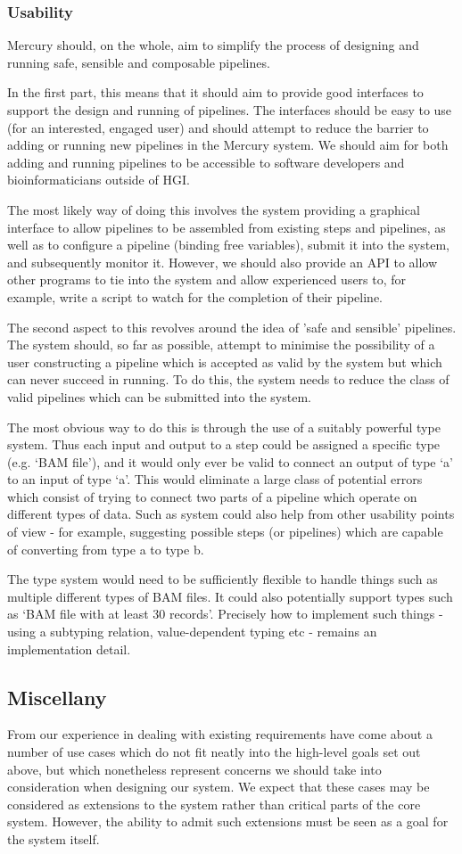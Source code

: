 \documentclass[10pt,a4paper]{article}
\newcommand{\npar}{\par\noindent\space}
\begin{document}
\subsubsection{Usability}
\npar Mercury should, on the whole, aim to simplify the process of designing and running safe, sensible and composable pipelines.
\npar In the first part, this means that it should aim to provide good interfaces to support the design and running of pipelines. The interfaces should be easy to use (for an interested, engaged user) and should attempt to reduce the barrier to adding or running new pipelines in the Mercury system. We should aim for both adding and running pipelines to be accessible to software developers and bioinformaticians outside of HGI.
\npar The most likely way of doing this involves the system providing a graphical interface to allow pipelines to be assembled from existing steps and pipelines, as well as to configure a pipeline (binding free variables), submit it into the system, and subsequently monitor it. However, we should also provide an API to allow other programs to tie into the system and allow experienced users to, for example, write a script to watch for the completion of their pipeline.
\npar The second aspect to this revolves around the idea of 'safe and sensible' pipelines. The system should, so far as possible, attempt to minimise the possibility of a user constructing a pipeline which is accepted as valid by the system but which can never succeed in running. To do this, the system needs to reduce the class of valid pipelines which can be submitted into the system.
\npar The most obvious way to do this is through the use of a suitably powerful type system. Thus each input and output to a step could be assigned a specific type (e.g. `BAM file'), and it would only ever be valid to connect an output of type `a' to an input of type `a'. This would eliminate a large class of potential errors which consist of trying to connect two parts of a pipeline which operate on different types of data. Such as system could also help from other usability points of view - for example, suggesting possible steps (or pipelines) which are capable of converting from type a to type b.
\npar The type system would need to be sufficiently flexible to handle things such as multiple different types of BAM files. It could also potentially support types such as `BAM file with at least 30 records'. Precisely how to implement such things - using a subtyping relation, value-dependent typing etc - remains an implementation detail. 

\subsection{Miscellany}
\npar From our experience in dealing with existing requirements have come about a number of use cases which do not fit neatly into the high-level goals set out above, but which nonetheless represent concerns we should take into consideration when designing our system. We expect that these cases may be considered as extensions to the system rather than critical parts of the core system. However, the ability to admit such extensions must be seen as a goal for the system itself.
\end{document}
